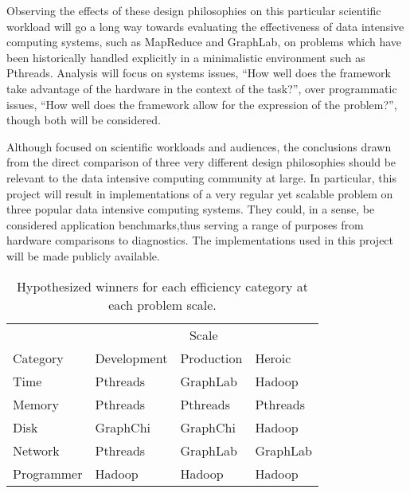\documentclass{article}
\begin{document}
Observing the effects of these design philosophies on this particular scientific workload will go a long way towards evaluating the effectiveness of data intensive computing systems, such as MapReduce and GraphLab, on problems which have been historically handled explicitly in a minimalistic environment such as Pthreads.  Analysis will focus on systems issues, ``How well does the framework take advantage of the hardware in the context of the task?'', over programmatic issues, ``How well does the framework allow for the expression of the problem?'', though both will be considered. 

Although focused on scientific workloads and audiences, the conclusions drawn from the direct comparison of three very different design philosophies should be relevant to the data intensive computing community at large.  In particular, this project will result in implementations of a very regular yet scalable problem on three popular data intensive computing systems.  They could, in a sense, be considered application benchmarks,thus serving a range of purposes from hardware comparisons to diagnostics.  The implementations used in this project will be made publicly available. 

\begin{table}
\centering
\begin{tabular}{l | l l l }
 & \multicolumn{3}{c}{Scale} \\
Category & Development & Production & Heroic \\
\hline
Time & Pthreads & GraphLab & Hadoop \\ 
Memory & Pthreads & Pthreads & Pthreads \\ 
Disk & GraphChi & GraphChi & Hadoop \\
Network & Pthreads & GraphLab & GraphLab \\
Programmer & Hadoop & Hadoop & Hadoop
\end{tabular}
\caption{Hypothesized winners for each efficiency category at each problem scale.}
\label{tbl:hyp}
\end{table}



\end{document}
